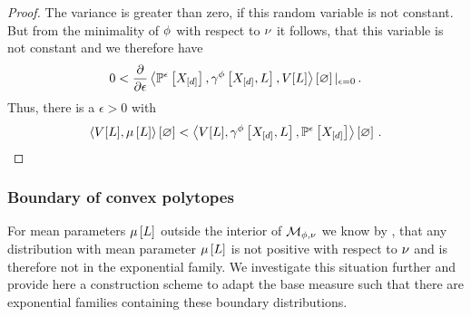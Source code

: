 \begin{proof}
		The variance is greater than zero, if this random variable is not constant.
		But from the minimality of $\phi$ with respect to $\nu$ it follows, that this variable is not constant and we therefore have
		\begin{align*}
			0 < \frac{\partial }{\partial \epsilon} \left\langle \mathbb{P}^{\epsilon}\left[X_{[d]}\right],\gamma^{\phi}\left[X_{[d]},L\right],V[L]\right\rangle \left[ \varnothing \right]|_{\epsilon=0} \, . 
		\end{align*}
		Thus, there is a $\epsilon>0$ with 
		\begin{align*}
			\left\langle V[L],\mu\left[L\right]\right\rangle \left[ \varnothing \right] < \left\langle V[L],\gamma^{\phi}\left[X_{[d]},L\right],\mathbb{P}^{\epsilon}\left[X_{[d]}\right]\right\rangle \left[ \varnothing \right] \, .
		\end{align*}

\end{proof}


\subsubsection{Boundary of convex polytopes}

For mean parameters $\mu\left[L\right]$ outside the interior of $\mathcal{M}_{\phi,\nu}$ we know by , that any distribution with mean parameter $\mu\left[L\right]$ is not positive with respect to $\nu$ and is therefore not in the exponential family.
We investigate this situation further and provide here a construction scheme to adapt the base measure such that there are exponential families containing these boundary distributions.


